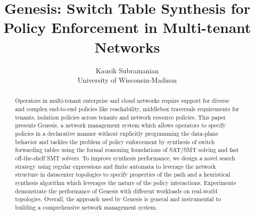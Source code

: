 \documentclass[letterpaper,twocolumn,10pt]{sig-alternate-10pt}
\title{Genesis: Switch Table Synthesis for Policy Enforcement in Multi-tenant Networks}
\author{Kausik Subramanian \\
	University of Wisconsin-Madison}
\begin{document}
\maketitle

\begin{abstract}
Operators in multi-tenant enterprise and cloud networks require support for diverse and complex end-to-end policies like reachability, middlebox traversals requirements for tenants, isolation policies across tenants and network resource policies. This paper presents Genesis, a network management system which allows operators to specify policies in a declarative manner without explicitly programming the data-plane behavior and tackles the problem of policy enforcement by synthesis of switch forwarding tables using the formal reasoning foundations of SAT/SMT solving and fast off-the-shelf SMT solvers. To improve synthesis performance, we design a novel search strategy using regular expressions and finite automata to leverage the network structure in datacenter topologies to specify properties of the path and a heuristical synthesis algorithm which leverages the nature of the policy interactions. Experiments demonstrate the performance of Genesis with different workloads on real-world topologies. Overall, the approach used by Genesis is general and instrumental to building a comprehensive network management system.

\end{abstract}










{}



\end{document}
